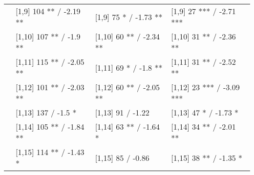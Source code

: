\begin{table}
\begin{tabular}[t]{llll}
 & {}[1,9] 104 ** / -2.19 ** & {}[1,9] 75 * / -1.73 ** & {}[1,9] 27 *** / -2.71 ***\\
 & {}[1,10] 107 ** / -1.9 ** & {}[1,10] 60 ** / -2.34 ** & {}[1,10] 31 ** / -2.36 **\\
 & {}[1,11] 115 ** / -2.05 ** & {}[1,11] 69 * / -1.8 ** & {}[1,11] 31 ** / -2.52 **\\
 & {}[1,12] 101 ** / -2.03 ** & {}[1,12] 60 ** / -2.05 ** & {}[1,12] 23 *** / -3.09 ***\\
\addlinespace
 & {}[1,13] 137  / -1.5 * & {}[1,13] 91  / -1.22 & {}[1,13] 47 * / -1.73 *\\
 & {}[1,14] 105 ** / -1.84 ** & {}[1,14] 63 ** / -1.64 * & {}[1,14] 34 ** / -2.01 **\\
 & {}[1,15] 114 ** / -1.43 * & {}[1,15] 85  / -0.86 & {}[1,15] 38 ** / -1.35 *\\
\bottomrule
\end{tabular}
\end{table}
